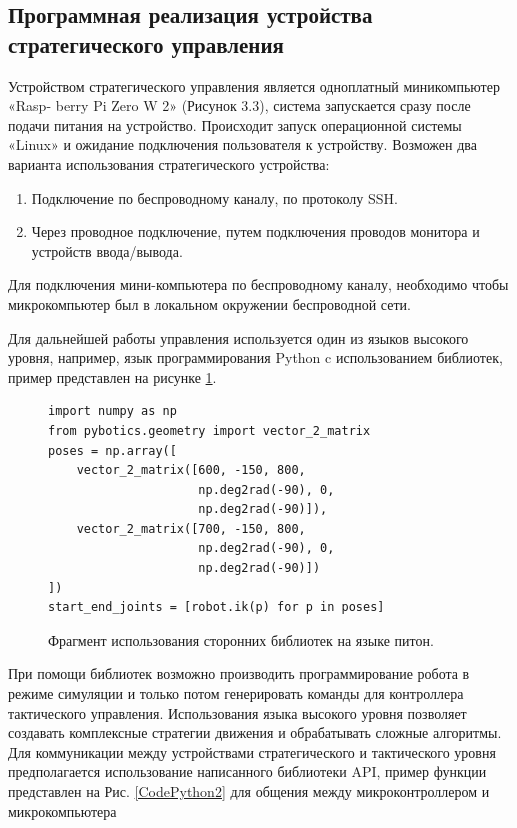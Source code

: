 \subsection{Программная реализация устройства стратегического управления}
Устройством стратегического управления является одноплатный миникомпьютер «Rasp- berry Pi Zero W 2» (Рисунок 3.3), система запускается сразу после подачи питания на устройство. Происходит запуск операционной системы «Linux» и ожидание подключения пользователя к устройству. Возможен два варианта использования стратегического устройства:

\begin{enumerate}
	\item Подключение по беспроводному каналу, по протоколу SSH.
	\item Через проводное подключение, путем подключения проводов монитора и устройств ввода/вывода.
\end{enumerate}

Для подключения мини-компьютера по беспроводному каналу, необходимо чтобы микрокомпьютер был в локальном окружении беспроводной сети.

Для дальнейшей работы управления используется один из языков высокого уровня, например, язык программирования Python c использованием библиотек, пример представлен на рисунке \ref{CodePython1}.
\begin{figure}[H]
	\centering

	\begin{verbatim}
import numpy as np
from pybotics.geometry import vector_2_matrix
poses = np.array([
    vector_2_matrix([600, -150, 800,
                     np.deg2rad(-90), 0,
                     np.deg2rad(-90)]),
    vector_2_matrix([700, -150, 800,
                     np.deg2rad(-90), 0,
                     np.deg2rad(-90)])
])
start_end_joints = [robot.ik(p) for p in poses]
	\end{verbatim}
	\caption{Фрагмент использования сторонних библиотек на языке питон.}\label{CodePython1}
\end{figure}


При помощи библиотек возможно производить программирование робота в режиме симуляции и только потом генерировать команды для контроллера тактического управления. Использования языка высокого уровня позволяет создавать комплексные стратегии движения и обрабатывать сложные алгоритмы. Для коммуникации между устройствами стратегического и тактического уровня предполагается использование написанного библиотеки API, пример функции представлен на Рис. \ref{CodePython2} для общения между микроконтроллером и микрокомпьютера


